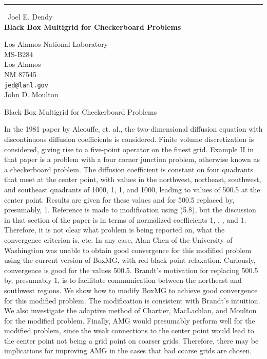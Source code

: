 \documentclass{report}
\begin{document}
\begin{center}
\rule{6in}{1pt} \
{\large Joel E. Dendy \\
{\bf Black Box Multigrid for Checkerboard Problems}}

Los Alamos National Laboratory \\ MS-B284 \\ Los Alamos \\ NM 87545
\\
{\tt jed@lanl.gov}\\
John D. Moulton\end{center}

Black Box Multigrid for Checkerboard Problems

In the 1981 paper by Alcouffe, et. al., the two-dimensional
diffusion equation with discontinuous diffusion coefficients is
considered. Finite volume discretization is considered, giving rise to
a five-point operator on the finest grid. Example II in that paper is
a problem with a four corner junction problem, otherwise known as a
checkerboard problem. The diffusion coefficient is constant on four
quadrants that meet at the center point, with values in the northwest,
northeast, southwest, and southeast quadrants of 1000, 1, 1, and 1000,
leading to values of 500.5 at the center point. Results are given for
these values and for 500.5 replaced by, presumably, 1. Reference is
made to modification using (5.8), but the discussion in that section of
the paper is in terms of normalized coefficients 1, \epsilon,
\epsilon, and 1. Therefore, it is not clear what problem is being
reported on, what the convergence criterion is, etc. In any case, Alan
Chen of the University of Washingtion was unable to obtain good
convergence for this modified problem using the current version of
BoxMG, with red-black point relaxation. Curiously, convergence is good
for the values 500.5. Brandt's motivation for replacing 500.5 by,
presumably 1, is to facilitate communication between the northeast and
southwest regions. We show how to modify BoxMG to achieve good
convergence for this modified problem. The modification is consistent
with Brandt's intuition. We also investigate the adaptive method of Chartier,
MacLachlan, and Moulton for the modified problem. Finally, AMG
would presumably perform well for the modified problem, since the weak
connections to the center point would lead to the center point not
being a grid point on coarser grids. Therefore, there may be
implications for improving AMG in the cases that bad coarse grids are
chosen.
\end{document}
